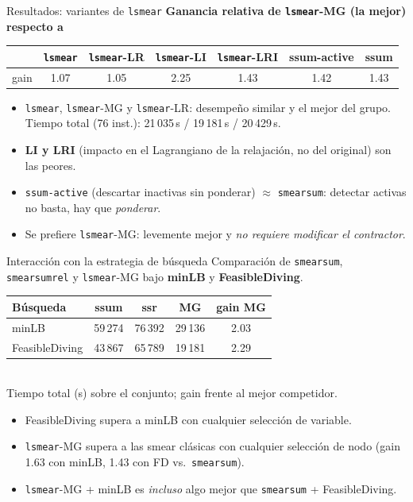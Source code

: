 \documentclass[10pt,aspectratio=169]{beamer}
\newcommand{\ls}{\texttt{lsmear}}
\begin{document}
\begin{frame}{Resultados: variantes de \ls{}}
\textbf{Ganancia relativa de \ls{}-MG (la mejor) respecto a}
\begin{center}
\begin{tabular}{@{}lcccccc@{}}
\toprule
 & \ls{} & \ls{}-LR & \ls{}-LI & \ls{}-LRI & ssum-active & ssum \\ \midrule
gain & 1.07 & 1.05 & 2.25 & 1.43 & 1.42 & 1.43 \\
\bottomrule
\end{tabular}
\end{center}
\begin{itemize}
  \item \ls{}, \ls{}-MG y \ls{}-LR: desempeño similar y el mejor del grupo. Tiempo total (76 inst.): 21\,035\,s / 19\,181\,s / 20\,429\,s.
  \item \textbf{LI y LRI} (impacto en el Lagrangiano de la relajación, no del original) son las peores.
  \item \texttt{ssum-active} (descartar inactivas sin ponderar) $\approx$ \texttt{smearsum}: detectar activas no basta, hay que \emph{ponderar}.
  \item Se prefiere \ls{}-MG: levemente mejor y \emph{no requiere modificar el contractor}.
\end{itemize}
\end{frame}

\begin{frame}{Interacción con la estrategia de búsqueda}
Comparación de \texttt{smearsum}, \texttt{smearsumrel} y \ls{}-MG bajo \textbf{minLB} y \textbf{FeasibleDiving}.
\begin{center}
\begin{tabular}{@{}lcccc@{}}
\toprule
Búsqueda & ssum & ssr & MG & gain MG \\ \midrule
minLB          & 59\,274 & 76\,392 & 29\,136 & 2.03 \\
FeasibleDiving & 43\,867 & 65\,789 & 19\,181 & 2.29 \\
\bottomrule
\end{tabular}\\[0.5ex]
{\footnotesize Tiempo total (s) sobre el conjunto; gain frente al mejor competidor.}
\end{center}
\begin{itemize}
  \item FeasibleDiving supera a minLB con cualquier selección de variable.
  \item \ls{}-MG supera a las smear clásicas con cualquier selección de nodo (gain 1.63 con minLB, 1.43 con FD vs.\ \texttt{smearsum}).
  \item \ls{}-MG + minLB es \emph{incluso} algo mejor que \texttt{smearsum} + FeasibleDiving.
\end{itemize}
\end{frame}
\end{document}
